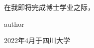 
\begin{thanks*}
	
	\linespread{1.15}
	\kaishu
	
	在我即将完成博士学业之际，

\vspace{1cm}  


{\hfill author \par \hfill 2022年4月于四川大学}


\end{thanks*}